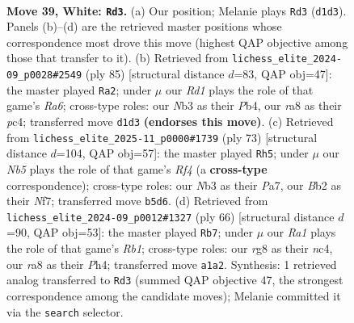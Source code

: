 \documentclass[11pt]{article}
\begin{document}
\clearpage

\begin{figure}[p]\centering
\begin{subfigure}{0.46\textwidth}\centering
\resizebox{\linewidth}{!}{%
\newchessgame
\chessboard[
  setfen={rn1b2r1/1p3b1p/1k4pP/pN2Pp2/P2p4/1N4P1/1B5K/R2R4 w - - 2 39},
  showmover=false,
  pgfstyle=straightmove, color=movearrow, markmove={d1-d3}
]}
\caption{}
\end{subfigure}\hfill
\begin{subfigure}{0.46\textwidth}\centering
\resizebox{\linewidth}{!}{%
\newchessgame
\chessboard[
  setfen={8/r4p2/6p1/2p1k3/1pPnP2p/rP1RKB1P/1R4P1/8 b - - 7 43},
  showmover=false,
  pgfstyle=straightmove, color=movearrow, markmove={a3-a2}
]}
\caption{}
\end{subfigure}
\\[4pt]
\begin{subfigure}{0.46\textwidth}\centering
\resizebox{\linewidth}{!}{%
\newchessgame
\chessboard[
  setfen={5k1r/pp3n2/2p3pP/4Pr2/5P1R/3B2R1/PPP5/2K5 b - - 2 37},
  showmover=false,
  pgfstyle=straightmove, color=movearrow, markmove={f5-h5}
]}
\caption{}
\end{subfigure}\hfill
\begin{subfigure}{0.46\textwidth}\centering
\resizebox{\linewidth}{!}{%
\newchessgame
\chessboard[
  setfen={3r1b2/5pp1/6p1/2rp1k2/2n2N1P/2B3P1/5P2/1R1R1K2 w - - 2 34},
  showmover=false,
  pgfstyle=straightmove, color=movearrow, markmove={b1-b7}
]}
\caption{}
\end{subfigure}
\caption{\textbf{Move 39, White: \texttt{Rd3}.} (a) Our position; Melanie plays \texttt{Rd3} (\texttt{d1d3}). Panels (b)--(d) are the retrieved master positions whose correspondence most drove this move (highest QAP objective among those that transfer to it). (b) Retrieved from \texttt{lichess\_elite\_2024-09\_p0028\#2549} (ply 85) [structural distance $d$=83, QAP obj=47]: the master played \texttt{Ra2}; under $\mu$ our \emph{Rd1} plays the role of that game's \emph{Ra6}; cross-type roles: our \emph{N}b3 as their \emph{P}b4, our \emph{r}a8 as their \emph{p}c4; transferred move \texttt{d1d3} \textbf{(endorses this move)}. (c) Retrieved from \texttt{lichess\_elite\_2025-11\_p0000\#1739} (ply 73) [structural distance $d$=104, QAP obj=57]: the master played \texttt{Rh5}; under $\mu$ our \emph{Nb5} plays the role of that game's \emph{Rf4} (a \textbf{cross-type} correspondence); cross-type roles: our \emph{N}b3 as their \emph{P}a7, our \emph{B}b2 as their \emph{N}f7; transferred move \texttt{b5d6}. (d) Retrieved from \texttt{lichess\_elite\_2024-09\_p0012\#1327} (ply 66) [structural distance $d$=90, QAP obj=53]: the master played \texttt{Rb7}; under $\mu$ our \emph{Ra1} plays the role of that game's \emph{Rb1}; cross-type roles: our \emph{r}g8 as their \emph{n}c4, our \emph{r}a8 as their \emph{P}h4; transferred move \texttt{a1a2}. Synthesis: 1 retrieved analog transferred to \texttt{Rd3} (summed QAP objective 47, the strongest correspondence among the candidate moves); Melanie committed it via the \texttt{search} selector.}
\label{fig:thought-m76}
\end{figure}
\end{document}
